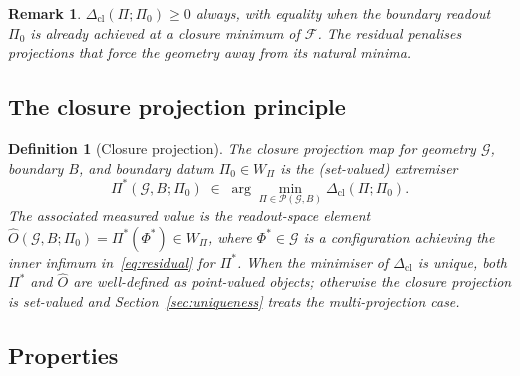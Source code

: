 \documentclass[12pt]{article}
\newtheorem{definition}[theorem]{Definition}
\newtheorem{remark}[theorem]{Remark}
\newcommand{\Fcal}{\mathcal{F}}
\newcommand{\Pcal}{\mathcal{P}}
\newcommand{\Gcal}{\mathcal{G}}
\newcommand{\Dcl}{\Delta_{\mathrm{cl}}}
\begin{document}
\begin{remark}
$\Dcl(\Pi; \Pi_0) \geq 0$ always, with equality when the boundary readout $\Pi_0$ is already achieved at a closure minimum of $\Fcal$. The residual penalises projections that force the geometry away from its natural minima.
\end{remark}

\subsection{The closure projection principle}

\begin{definition}[Closure projection]\label{def:closure_projection}
The \textit{closure projection map} for geometry $\Gcal$, boundary $B$, and boundary datum $\Pi_0 \in W_\Pi$ is the (set-valued) extremiser
\begin{equation}\label{eq:observable}
    \boxed{\Pi^*(\Gcal, B; \Pi_0) \;\in\; \arg\min_{\Pi \in \Pcal(\Gcal, B)} \Dcl(\Pi; \Pi_0).}
\end{equation}
The associated \emph{measured value} is the readout-space element $\hat{O}(\Gcal, B; \Pi_0) = \Pi^*(\Phi^*) \in W_\Pi$, where $\Phi^* \in \Gcal$ is a configuration achieving the inner infimum in~\eqref{eq:residual} for $\Pi^*$. When the minimiser of $\Dcl$ is unique, both $\Pi^*$ and $\hat{O}$ are well-defined as point-valued objects; otherwise the closure projection is set-valued and Section~\ref{sec:uniqueness} treats the multi-projection case.
\end{definition}

\subsection{Properties}
\end{document}
